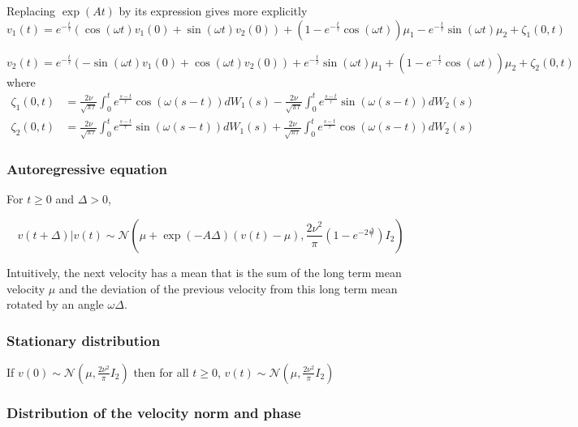 \documentclass[11pt]{article}
\newcommand {\1}{\mathbb{1}}
\begin{document}
Replacing $\exp(At)$ by its expression gives more explicitly
\begin{equation}
	v_1(t)=e^{-\frac{t}{\tau}} \left(\cos(\omega t)v_1(0)+\sin(\omega t)v_2(0)\right)+(1-e^{-\frac{t}{\tau}}\cos(\omega t))\mu_1-e^{-\frac{t}{\tau}} \sin(\omega t) \mu_2 +\zeta_1(0,t)
	\label{eq: first random component RACVM}
\end{equation}


\begin{equation}
	v_2(t)=e^{-\frac{t}{\tau}} \left(-\sin(\omega t)v_1(0)+\cos(\omega t)v_2(0)\right)+e^{-\frac{t}{\tau}} \sin(\omega t) \mu_1+(1-e^{-\frac{t}{\tau}}\cos(\omega t))\mu_2 +\zeta_2(0,t)
	\label{eq: second random component RACVM}
\end{equation}
where \begin{align*}
	\zeta_1(0,t)&=\frac{2\nu}{\sqrt{\pi \tau}} \int_0^t e^{\frac{s-t}{\tau}} \cos(\omega(s-t)) dW_1(s) -\frac{2\nu}{\sqrt{\pi \tau}} \int_0^t e^{\frac{s-t}{\tau}} \sin(\omega(s-t)) dW_2(s) \\
	\zeta_2(0,t)&=\frac{2\nu}{\sqrt{\pi \tau}} \int_0^t e^{\frac{s-t}{\tau}} \sin(\omega(s-t)) dW_1(s) +\frac{2\nu}{\sqrt{\pi \tau}} \int_0^t e^{\frac{s-t}{\tau}} \cos(\omega(s-t)) dW_2(s)
\end{align*}
\subsubsection{Autoregressive equation}

For $t \geq 0$ and $\Delta >0$, 

\[v(t+\Delta) \vert v(t) \sim \mathcal{N}\left( \mu + \exp(-A\Delta)(v(t)-\mu), \frac{2\nu^2}{\pi}(1-e^{-2\frac{\Delta}{\tau}}) I_2 \right) \]

Intuitively, the next velocity has a mean that is the sum of the long term mean velocity $\mu$ and the deviation of the previous velocity from this long term mean rotated by an angle $\omega \Delta$.
\subsubsection{Stationary distribution}

If $v(0) \sim \mathcal{N}\left(\mu,\frac{2\nu^2}{\pi} I_2\right)$ then for all $t \geq 0$, $v(t) \sim \mathcal{N}\left(\mu,\frac{2\nu^2}{\pi} I_2\right)$

\subsubsection{Distribution of the velocity norm and phase}
\end{document}
